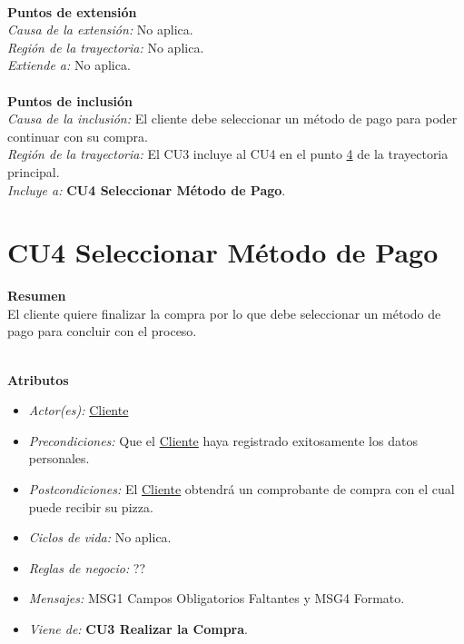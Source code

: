 \noindent \textbf{\\Puntos de extensión}\\

\noindent \textit{Causa de la extensión:} No aplica.\\
\textit{Región de la trayectoria:} No aplica.\\
\textit{Extiende a:} No aplica.\\


\noindent \textbf{\\Puntos de inclusión}\\

\noindent \textit{Causa de la inclusión:} El cliente debe seleccionar un método de pago para poder continuar con su compra.\\
\textit{Región de la trayectoria:} El CU3 incluye al CU4 en el punto \hyperlink{CU3:TP:P4}{4} de la trayectoria principal. \\
\textit{Incluye a:} \textbf{CU4 Seleccionar Método de Pago}.\\

\hypertarget{CU4}{}
\section{CU4 Seleccionar Método de Pago}

\noindent \textbf{Resumen}\\

El cliente quiere finalizar la compra por lo que debe seleccionar un método de pago para concluir con el proceso.

\noindent \textbf{\\Atributos}

\begin{itemize}
	
	\item \textit{Actor(es):} \hyperlink{A:Cliente}{Cliente}
	\item \textit{Precondiciones:} Que el \hyperlink{A:Cliente}{Cliente} haya registrado exitosamente los datos personales.
	\item \textit{Postcondiciones:} El \hyperlink{A:Cliente}{Cliente} obtendrá un comprobante de compra con el cual puede recibir su pizza.
	\item \textit{Ciclos de vida:} No aplica.
	\item \textit{Reglas de negocio:} ??
	\item \textit{Mensajes:} MSG1 Campos Obligatorios Faltantes y MSG4 Formato.
	\item \textit{Viene de:} \textbf{CU3 Realizar la Compra}.
	
\end{itemize} 

